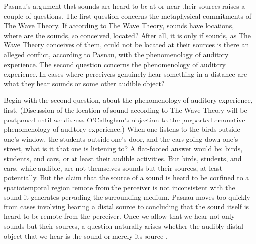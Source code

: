 Pasnau's argument that sounds are heard to be at or near their sources raises a couple of questions. The first question concerns the metaphysical commitments of The Wave Theory. If according to The Wave Theory, sounds have locations, where are the sounds, so conceived, located? After all, it is only if sounds, as The Wave Theory conceives of them, could not be located at their sources is there an alleged conflict, according to Pasnau, with the phenomenology of auditory experience.  The second question concerns the phenomenology of auditory experience. In cases where perceivers genuinely hear something in a distance are what they hear sounds or some other audible object? 

Begin with the second question, about the phenomenology of auditory experience, first. (Discussion of the location of sound according to The Wave Theory will be postponed until we discuss O'Callaghan's \citeyear{OCallaghan:2007xy,OCallaghan:2009aa} objection to the purported emanative phenomenology of auditory experience.) When one listens to the birds outside one's window, the students outside one's door, and the cars going down one's street, what is it that one is listening to? A flat-footed answer would be: birds, students, and cars, or at least their audible activities. But birds, students, and cars, while audible, are not themselves sounds but their sources, at least potentially. But the claim that the source of a sound is heard to be confined to a spatiotemporal region remote from the perceiver is not inconsistent with the sound it generates pervading the surrounding medium. Pasnau moves too quickly from cases involving hearing a distal source to concluding that the sound itself is heard to be remote from the perceiver. Once we allow that we hear not only sounds but their sources, a question naturally arises whether the audibly distal object that we hear is the sound or merely its source \citep[see][123, for a development of this worry]{OShaughnessy:2009aa}.

